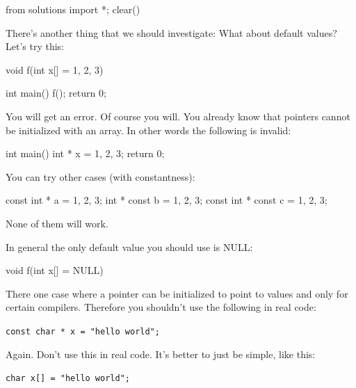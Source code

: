 \begin{python0}
from solutions import *; clear()
\end{python0}

There's another thing that we should investigate: What about default values? Let's try this:

\begin{consolethree}[escapeinside=||]
void f(int x[] = {1, 2, 3})
{}

int main()
{
    f();
    return 0;
}
\end{consolethree}

You will get an error. Of course you will. You already know that pointers cannot be initialized with an array. In other words the following is invalid:

\begin{consolethree}[escapeinside=||]
int main()
{
    int * x = {1, 2, 3};
    return 0;
}
\end{consolethree}

You can try other cases (with constantness):

\begin{consolethree}[escapeinside=||]
const int * a = {1, 2, 3};
int * const b = {1, 2, 3};
const int * const c = {1, 2, 3};
\end{consolethree}

None of them will work.

In general the only default value you should use is NULL:

\begin{consolethree}[escapeinside=||]
void f(int x[] = NULL)
{}
\end{consolethree}

There  one case where a pointer can be initialized to point to values and only for certain compilers. Therefore you shouldn't use the following in real code:

\verb!const char * x = "hello world";!

Again. Don't use this in real code. It's better to just be simple, like this:

\verb!char x[] = "hello world";!


